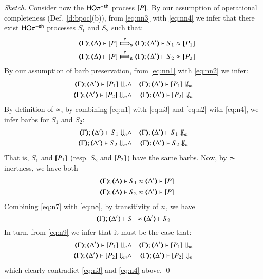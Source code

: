 \begin{proof}[Sketch]
Consider now the $\mathsf{HO}\pi^{\mathsf{-sh}}$ process $[\!\![P]\!\!]$.
By our assumption of operational completeness 
(Def.~\ref{d:bpoc}(b)), 
from \eqref{eq:nn3} with \eqref{eq:nn4}
we infer that
there exist $\mathsf{HO}\pi^{\mathsf{-sh}}$ processes $S_1$ and $S_2$ such that:
\begin{eqnarray}
& & \shwtytra{\mapt{\Gamma}}{\tau}{\mapt{\Delta}}{\map{P}}{\mapt{\Delta'}}{S_1 \wb \map{P_1}} \label{eq:n1} \\
& & \shwtytra{\mapt{\Gamma}}{\tau}{\mapt{\Delta}}{\map{P}}{\mapt{\Delta'}}{S_2 \wb \map{P_2}} \label{eq:n2}
\end{eqnarray}
By our assumption of barb preservation, 
from \eqref{eq:nn1} with \eqref{eq:nn2}
we infer: 
\begin{eqnarray}
\mapt{\Gamma}; \mapt{\Delta'} \proves \map{P_1} \Barb{n} & \land & 
\mapt{\Gamma}; \mapt{\Delta'} \proves \map{P_1} \nBarb{m} \label{eq:n3} \\
\mapt{\Gamma}; \mapt{\Delta'} \proves \map{P_2} \Barb{m} & \land & 
\mapt{\Gamma}; \mapt{\Delta'} \proves \map{P_2} \nBarb{n} \label{eq:n4}
\end{eqnarray}
By definition of $\approx$, 
by combining 
\eqref{eq:n1} with \eqref{eq:n3}
and
\eqref{eq:n2} with \eqref{eq:n4}, we infer barbs for $S_1$ and $S_2$:
\begin{eqnarray}
\mapt{\Gamma}; \mapt{\Delta'} \proves S_1 \Barb{n} & \land & 
\mapt{\Gamma}; \mapt{\Delta'} \proves S_1 \nBarb{m} \label{eq:n5} \\
\mapt{\Gamma}; \mapt{\Delta'} \proves S_2 \Barb{m} & \land & 
\mapt{\Gamma}; \mapt{\Delta'} \proves S_2 \nBarb{n} \label{eq:n6}
\end{eqnarray}
That is, $S_1$ and $[\!\![P_1]\!\!]$ 
(resp. $S_2$ and $[\!\![P_2]\!\!]$)
 have the same barbs.
Now, by $\tau$-inertness, we have both 
\begin{eqnarray}
& & \horel{\mapt{\Gamma}}{\mapt{\Delta}}{S_1}{\wb}{\mapt{\Delta'}}{\map{P}} \label{eq:n7} \\
& & \horel{\mapt{\Gamma}}{\mapt{\Delta}}{S_2}{\wb}{\mapt{\Delta'}}{\map{P}} \label{eq:n8}
\end{eqnarray}
Combining \eqref{eq:n7} with \eqref{eq:n8}, by transitivity of $\approx$,
we have 
\begin{equation}
\horel{\mapt{\Gamma}}{\mapt{\Delta'}}{S_1}{\wb}{\mapt{\Delta'}}{S_2} \label{eq:n9}
\end{equation}
In turn, from \eqref{eq:n9}
we infer that 
it must be the case that:
\begin{eqnarray*}
\mapt{\Gamma}; \mapt{\Delta'} \proves \map{P_1} \Barb{n} & \land & 
\mapt{\Gamma}; \mapt{\Delta'} \proves \map{P_1} \Barb{m} \label{eq:n10} \\
\mapt{\Gamma}; \mapt{\Delta'} \proves \map{P_2} \Barb{m} & \land & 
\mapt{\Gamma}; \mapt{\Delta'} \proves \map{P_2} \Barb{n} \label{eq:n11}
\end{eqnarray*}
which clearly contradict \eqref{eq:n3} and \eqref{eq:n4} above.
\qed
\end{proof}

